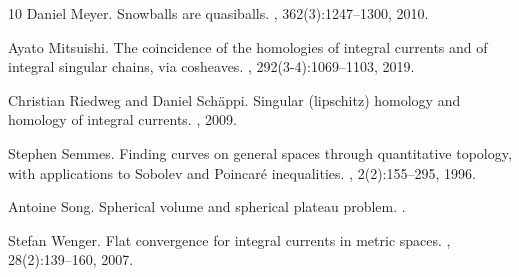\documentclass{amsart}
\numberwithin{equation}{section}
\begin{document}
\begin{thebibliography}{10}
Daniel Meyer.
\newblock Snowballs are quasiballs.
, 362(3):1247--1300, 2010.

Ayato Mitsuishi.
\newblock The coincidence of the homologies of integral currents and of integral singular chains, via cosheaves.
, 292(3-4):1069--1103, 2019.

Christian Riedweg and Daniel Sch{\"a}ppi.
\newblock Singular (lipschitz) homology and homology of integral currents.
, 2009.

Stephen Semmes.
\newblock Finding curves on general spaces through quantitative topology, with applications to {Sobolev} and {Poincar{\'e}} inequalities.
, 2(2):155--295, 1996.

Antoine Song.
\newblock Spherical volume and spherical plateau problem.
.

Stefan Wenger.
\newblock Flat convergence for integral currents in metric spaces.
, 28(2):139--160, 2007.

\end{thebibliography}
\end{document}
